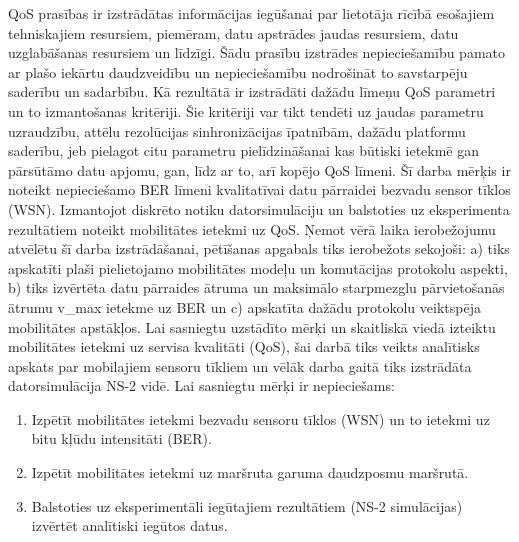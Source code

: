 \acf{QoS} prasības ir izstrādātas informācijas iegūšanai par lietotāja rīcībā esošajiem tehniskajiem resursiem, piemēram, datu apstrādes jaudas resursiem, datu uzglabāšanas resursiem un līdzīgi. Šādu prasību izstrādes nepieciešamību pamato ar plašo iekārtu daudzveidību un nepieciešamību nodrošināt to savstarpēju saderību un sadarbību. Kā rezultātā ir izstrādāti dažādu līmeņu QoS parametri un to izmantošanas kritēriji. Šie kritēriji var tikt tendēti uz jaudas parametru uzraudzību, attēlu rezolūcijas sinhronizācijas īpatnībām, dažādu platformu saderību, jeb pielagot citu parametru pielīdzināšanai kas būtiski ietekmē gan pārsūtāmo datu apjomu, gan, līdz ar to, arī kopējo QoS līmeni. Šī darba mērķis ir noteikt nepieciešamo BER līmeni kvalitatīvai datu pārraidei bezvadu sensor tīklos (WSN). Izmantojot diskrēto notiku datorsimulāciju un balstoties uz eksperimenta rezultātiem noteikt mobilitātes ietekmi uz QoS. Ņemot vērā laika ierobežojumu atvēlētu šī darba izstrādāšanai, pētīšanas apgabals tiks ierobežots sekojoši: a) tiks apskatīti plaši pielietojamo mobilitātes modeļu un komutācijas protokolu aspekti, b) tiks izvērtēta datu pārraides ātruma un maksimālo starpmezglu pārvietošanās ātrumu \gls{v_max} ietekme uz BER  un c) apskatīta dažādu protokolu veiktspēja mobilitātes apstākļos.
Lai sasniegtu uzstādīto mērķi un skaitliskā viedā izteiktu mobilitātes ietekmi uz servisa kvalitāti (\acs{QoS}), šai darbā tiks veikts analītisks apskats par mobilajiem sensoru tīkliem un vēlāk darba gaitā tiks izstrādāta datorsimulācija \ac{NS-2} vidē. Lai sasniegtu mērķi ir nepieciešams:
\begin{enumerate}[label=\arabic*)]
\item Izpētīt mobilitātes ietekmi bezvadu sensoru tīklos (\acs{WSN}) un to ietekmi uz bitu kļūdu intensitāti (\acs{BER}).
\item Izpētīt mobilitātes ietekmi uz maršruta garuma daudzposmu maršrutā.
\item Balstoties uz eksperimentāli iegūtajiem rezultātiem (NS-2 simulācijas) izvērtēt analītiski iegūtos datus.
\end{enumerate}


